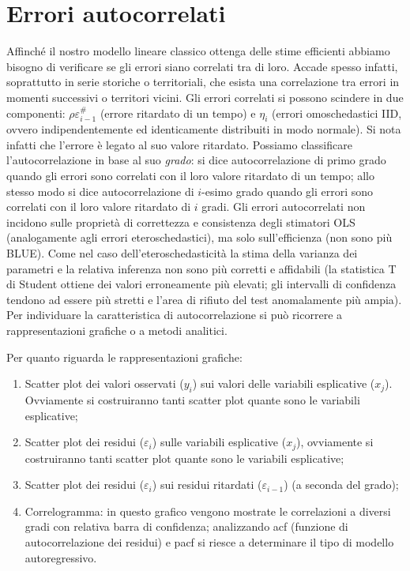 \documentclass[a4page, 11pt]{article} %
\begin{document}
\section{Errori autocorrelati}

Affinché il nostro modello lineare classico ottenga delle stime efficienti abbiamo bisogno di verificare se gli errori siano correlati tra di loro.
Accade spesso infatti, soprattutto in serie storiche o territoriali, che esista una correlazione tra errori in momenti successivi o territori vicini.
Gli errori correlati si possono scindere in due componenti: $\rho \varepsilon_{i-1}^{\#}$ (errore ritardato di un tempo) e $\eta_i$ (errori omoschedastici IID, ovvero indipendentemente ed identicamente distribuiti in modo normale).
Si nota infatti che l’errore è legato al suo valore ritardato.
Possiamo classificare l’autocorrelazione in base al suo \textit{grado}: si dice autocorrelazione di primo grado quando gli errori sono correlati con il loro valore ritardato di un tempo; allo stesso modo si dice autocorrelazione di $i$-esimo grado quando gli errori sono correlati con il loro valore ritardato di $i$ gradi. Gli errori autocorrelati non incidono sulle proprietà di correttezza e consistenza degli stimatori OLS (analogamente agli errori eteroschedastici), ma solo sull’efficienza (non sono più BLUE). Come nel caso dell’eteroschedasticità la stima della varianza dei parametri e la relativa inferenza non sono più corretti e affidabili (la statistica T di Student ottiene dei valori erroneamente più elevati; gli intervalli di confidenza tendono ad essere più stretti e l'area di rifiuto del test anomalamente più ampia).
Per individuare la caratteristica di autocorrelazione si può ricorrere a rappresentazioni grafiche o a metodi analitici.

Per quanto riguarda le rappresentazioni grafiche:
\begin{enumerate}[noitemsep]
\item Scatter plot dei valori osservati ($y_i$) sui valori delle variabili esplicative ($x_j$). Ovviamente si costruiranno tanti scatter plot quante sono le variabili esplicative;
\item Scatter plot dei residui ($\varepsilon_i$) sulle variabili esplicative ($x_j$), ovviamente si costruiranno tanti scatter plot quante sono le variabili esplicative;
\item Scatter plot dei residui ($\varepsilon_i$) sui residui ritardati ($\varepsilon_{i-1}$) (a seconda del grado);
\item Correlogramma: in questo grafico vengono mostrate le correlazioni a diversi gradi con relativa barra di confidenza; analizzando acf (funzione di autocorrelazione dei residui) e pacf si riesce a determinare il tipo di modello autoregressivo.\end{enumerate}
\end{document}
